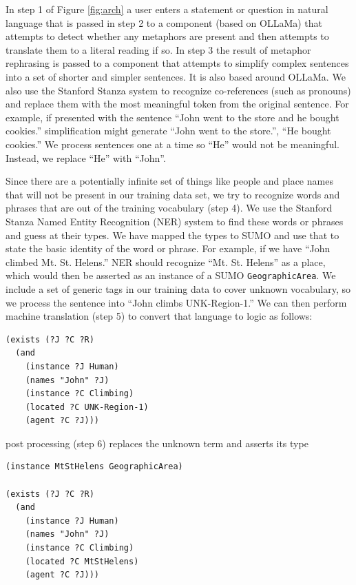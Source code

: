\documentclass[runningheads]{llncs}
\begin{document}
In step 1 of Figure \ref{fig:arch} a user enters a statement or question in natural language that is passed in step 2 to a component (based on OLLaMa) that attempts to detect whether any metaphors are present and then attempts to translate them to a literal reading if so.
In step 3 the result of metaphor rephrasing is passed to a component that attempts to simplify complex sentences into a set of shorter and simpler sentences.  It is also based around OLLaMa.  We also use the Stanford Stanza system to recognize co-references (such as pronouns) and replace them with the most meaningful token from the original sentence.  For example, if presented with the sentence ``John went to the store and he bought cookies.'' simplification might generate ``John went to the store.'', ``He bought cookies.''  We process sentences one at a time so ``He'' would not be meaningful.  Instead, we replace ``He'' with ``John''.

Since there are a potentially infinite set of things like people and place names that will not be present in our training data set, we try to recognize words and phrases that are out of the training vocabulary (step 4).  We use the Stanford Stanza Named Entity Recognition (NER) system to find these words or phrases and guess at their types.  We have mapped the types to SUMO and use that to state the basic identity of the word or phrase.  For example, if we have ``John climbed Mt. St. Helens.'' NER should recognize ``Mt. St. Helens'' as a place, which would then be asserted as an instance of a SUMO \texttt{GeographicArea}.  We include a set of generic tags in our training data to cover unknown vocabulary, so we process the sentence into ``John climbs UNK-Region-1.''  We can then perform machine translation (step 5) to convert that language to logic as follows:

\begin{verbatim}
(exists (?J ?C ?R)
  (and
    (instance ?J Human)
    (names "John" ?J)
    (instance ?C Climbing)
    (located ?C UNK-Region-1)
    (agent ?C ?J)))
\end{verbatim}

post processing (step 6) replaces the unknown term and asserts its type

\begin{verbatim}
(instance MtStHelens GeographicArea)

(exists (?J ?C ?R)
  (and
    (instance ?J Human)
    (names "John" ?J)
    (instance ?C Climbing)
    (located ?C MtStHelens)
    (agent ?C ?J)))
\end{verbatim}
\end{document}
